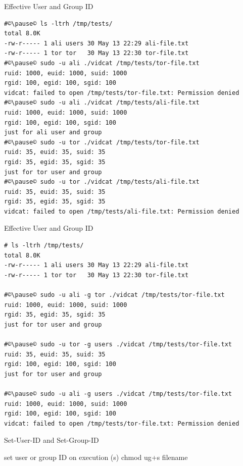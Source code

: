 \documentclass[xcolor={rgb}]{beamer}
\begin{document}
	\begin{frame}[fragile]{Effective User and Group ID}
		\begin{verbatim}
#©\pause© ls -ltrh /tmp/tests/
total 8.0K
-rw-r----- 1 ali users 30 May 13 22:29 ali-file.txt
-rw-r----- 1 tor tor   30 May 13 22:30 tor-file.txt
#©\pause© sudo -u ali ./vidcat /tmp/tests/tor-file.txt
ruid: 1000, euid: 1000, suid: 1000
rgid: 100, egid: 100, sgid: 100
vidcat: failed to open /tmp/tests/tor-file.txt: Permission denied
#©\pause© sudo -u ali ./vidcat /tmp/tests/ali-file.txt
ruid: 1000, euid: 1000, suid: 1000
rgid: 100, egid: 100, sgid: 100
just for ali user and group
#©\pause© sudo -u tor ./vidcat /tmp/tests/tor-file.txt
ruid: 35, euid: 35, suid: 35
rgid: 35, egid: 35, sgid: 35
just for tor user and group
#©\pause© sudo -u tor ./vidcat /tmp/tests/ali-file.txt
ruid: 35, euid: 35, suid: 35
rgid: 35, egid: 35, sgid: 35
vidcat: failed to open /tmp/tests/ali-file.txt: Permission denied
		\end{verbatim}
	\end{frame}
	
	\begin{frame}[fragile]{Effective User and Group ID}
		\begin{verbatim}
# ls -ltrh /tmp/tests/
total 8.0K
-rw-r----- 1 ali users 30 May 13 22:29 ali-file.txt
-rw-r----- 1 tor tor   30 May 13 22:30 tor-file.txt

#©\pause© sudo -u ali -g tor ./vidcat /tmp/tests/tor-file.txt
ruid: 1000, euid: 1000, suid: 1000
rgid: 35, egid: 35, sgid: 35
just for tor user and group

#©\pause© sudo -u tor -g users ./vidcat /tmp/tests/tor-file.txt
ruid: 35, euid: 35, suid: 35
rgid: 100, egid: 100, sgid: 100
just for tor user and group

#©\pause© sudo -u ali -g users ./vidcat /tmp/tests/tor-file.txt
ruid: 1000, euid: 1000, suid: 1000
rgid: 100, egid: 100, sgid: 100
vidcat: failed to open /tmp/tests/tor-file.txt: Permission denied
		\end{verbatim}
	\end{frame}

	\begin{frame}[fragile]{Set-User-ID and Set-Group-ID}
        \begin{center}
        \huge set user or group ID on execution (s)
        \huge chmod ug+s filename
        \end{center}
	\end{frame}
\end{document}
